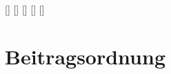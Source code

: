 
 
[]{}{}
[]{}{}
[]{}{}
[]{}{}
[]{}{}
 


\subject{Vereinsordnung}
\title{\name}
\subtitle{Vereinsordnung für den \name}
\date{\today\\ \version}
\maketitle

\tableofcontents

\appendix

\section{Beitragsordnung}
